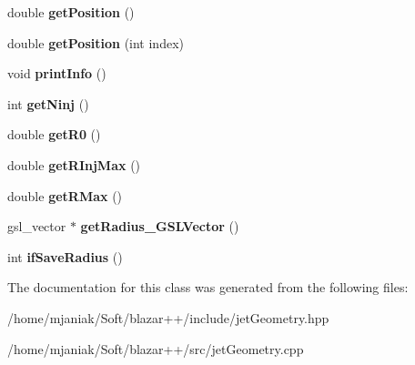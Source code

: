 \begin{DoxyCompactItemize}
\item 
\hypertarget{classjetGeometry_ad5b17b9b6be29fda8b8c012347142c17}{double {\bfseries get\-Position} ()}\label{classjetGeometry_ad5b17b9b6be29fda8b8c012347142c17}

\item 
\hypertarget{classjetGeometry_a3490dafbe35896560ba2cc9ef1461f10}{double {\bfseries get\-Position} (int index)}\label{classjetGeometry_a3490dafbe35896560ba2cc9ef1461f10}

\item 
\hypertarget{classjetGeometry_a4a2386eda15f16e6c0a24433116898d8}{void {\bfseries print\-Info} ()}\label{classjetGeometry_a4a2386eda15f16e6c0a24433116898d8}

\item 
\hypertarget{classjetGeometry_ae66c12983e87c67a1c7601a53389575f}{int {\bfseries get\-Ninj} ()}\label{classjetGeometry_ae66c12983e87c67a1c7601a53389575f}

\item 
\hypertarget{classjetGeometry_ad0ab1140dc51cfa933b94254d659fe23}{double {\bfseries get\-R0} ()}\label{classjetGeometry_ad0ab1140dc51cfa933b94254d659fe23}

\item 
\hypertarget{classjetGeometry_ad97dbfdf7252e15d297d4c0696eff76b}{double {\bfseries get\-R\-Inj\-Max} ()}\label{classjetGeometry_ad97dbfdf7252e15d297d4c0696eff76b}

\item 
\hypertarget{classjetGeometry_ab2104e4f24e6733e8179d07b4faca1b1}{double {\bfseries get\-R\-Max} ()}\label{classjetGeometry_ab2104e4f24e6733e8179d07b4faca1b1}

\item 
\hypertarget{classjetGeometry_a54eed30a1333c075545f0aae18d9f8f7}{gsl\-\_\-vector $\ast$ {\bfseries get\-Radius\-\_\-\-G\-S\-L\-Vector} ()}\label{classjetGeometry_a54eed30a1333c075545f0aae18d9f8f7}

\item 
\hypertarget{classjetGeometry_a5422d39d309d07f4f3eee857397b8247}{int {\bfseries if\-Save\-Radius} ()}\label{classjetGeometry_a5422d39d309d07f4f3eee857397b8247}

\end{DoxyCompactItemize}


The documentation for this class was generated from the following files\-:\begin{DoxyCompactItemize}
\item 
/home/mjaniak/\-Soft/blazar++/include/jet\-Geometry.\-hpp\item 
/home/mjaniak/\-Soft/blazar++/src/jet\-Geometry.\-cpp\end{DoxyCompactItemize}
